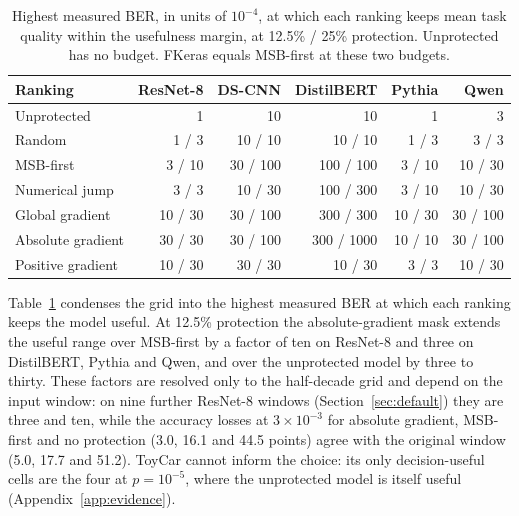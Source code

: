 \begin{table}[t]
\caption{Highest measured BER, in units of $10^{-4}$, at which each ranking keeps mean task quality within the usefulness margin, at 12.5\% / 25\% protection. Unprotected has no budget. FKeras equals MSB-first at these two budgets.}\label{tab:useful}
\centering\small
\begin{tabular}{l r r r r r}\toprule
Ranking & ResNet-8 & DS-CNN & DistilBERT & Pythia & Qwen\\\midrule
Unprotected & 1 & 10 & 10 & 1 & 3\\
Random & 1 / 3 & 10 / 10 & 10 / 10 & 1 / 3 & 3 / 3\\
MSB-first & 3 / 10 & 30 / 100 & 100 / 100 & 3 / 10 & 10 / 30\\
Numerical jump & 3 / 3 & 10 / 30 & 100 / 300 & 3 / 10 & 10 / 30\\
Global gradient & 10 / 30 & 30 / 100 & 300 / 300 & 10 / 30 & 30 / 100\\
Absolute gradient & 30 / 30 & 30 / 100 & 300 / 1000 & 10 / 10 & 30 / 100\\
Positive gradient & 10 / 30 & 30 / 30 & 10 / 30 & 3 / 3 & 10 / 30\\\bottomrule
\end{tabular}
\end{table}

Table~\ref{tab:useful} condenses the grid into the highest measured BER at which each ranking keeps the model useful. At 12.5\% protection the absolute-gradient mask extends the useful range over MSB-first by a factor of ten on ResNet-8 and three on DistilBERT, Pythia and Qwen, and over the unprotected model by three to thirty. These factors are resolved only to the half-decade grid and depend on the input window: on nine further ResNet-8 windows (Section~\ref{sec:default}) they are three and ten, while the accuracy losses at $3\times10^{-3}$ for absolute gradient, MSB-first and no protection (3.0, 16.1 and 44.5 points) agree with the original window (5.0, 17.7 and 51.2). ToyCar cannot inform the choice: its only decision-useful cells are the four at $p=10^{-5}$, where the unprotected model is itself useful (Appendix~\ref{app:evidence}).


